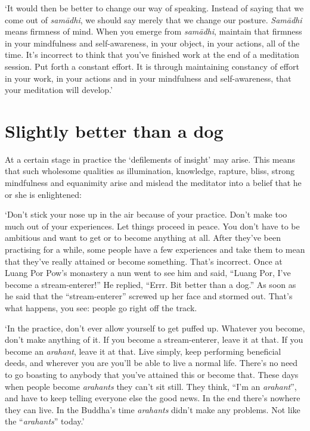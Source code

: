 `It would then be better to change our way of speaking. Instead of
saying that we come out of \emph{samādhi}, we should say merely that we
change our posture. \emph{Samādhi} means firmness of mind. When you
emerge from \emph{samādhi}, maintain that firmness in your mindfulness
and self-awareness, in your object, in your actions, all of the time. 
It's incorrect to think that you've finished work at the end of a
meditation session. Put forth a constant effort. It is through
maintaining constancy of effort in your work, in your actions and in
your mindfulness and self-awareness, that your meditation will develop.'

\section{Slightly better than a dog}

At a certain stage in practice the `defilements of insight' may arise. 
This means that such wholesome qualities as illumination, knowledge, 
rapture, bliss, strong mindfulness and equanimity arise and mislead the
meditator into a belief that he or she is enlightened: 

`Don't stick your nose up in the air because of your practice. Don't
make too much out of your experiences. Let things proceed in peace. You
don't have to be ambitious and want to get or to become anything at all. 
After they've been practising for a while, some people have a few
experiences and take them to mean that they've really attained or become
something. That's incorrect. Once at Luang Por Pow's monastery a nun
went to see him and said, ``Luang Por, I've become a stream-enterer!''
He replied, ``Errr. Bit better than a dog.'' As soon as he said that the
``stream-enterer'' screwed up her face and stormed out. That's what
happens, you see: people go right off the track. 

`In the practice, don't ever allow yourself to get puffed up. Whatever
you become, don't make anything of it. If you become a stream-enterer, 
leave it at that. If you become an \emph{arahant}, leave it at that. 
Live simply, keep performing beneficial deeds, and wherever you are
you'll be able to live a normal life. There's no need to go boasting to
anybody that you've attained this or become that. These days when people
become \emph{arahants} they can't sit still. They think, ``I'm an
\emph{arahant}'', and have to keep telling everyone else the good news. 
In the end there's nowhere they can live. In the Buddha's time
\emph{arahants} didn't make any problems. Not like the
``\emph{arahants}'' today.'

